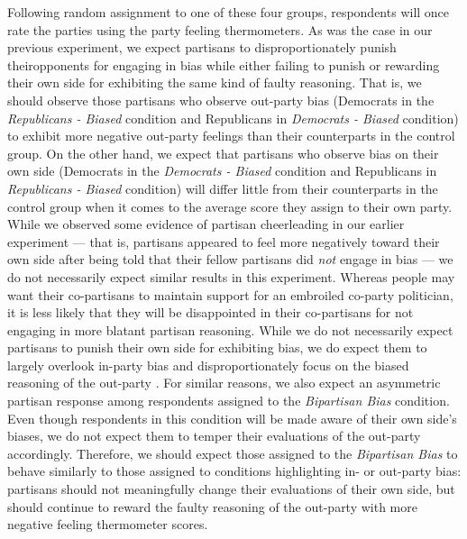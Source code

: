 \documentclass[12pt, letterpaper]{article}
\begin{document}
Following random assignment to one of these four groups, respondents will once rate the parties using the party feeling thermometers. As was the case in our previous experiment, we expect partisans to disproportionately punish theiropponents for engaging in bias while either failing to punish or rewarding their own side for exhibiting the same kind of faulty reasoning. That is, we should observe those partisans who observe out-party bias (Democrats in the \textit{Republicans - Biased} condition and Republicans in \textit{Democrats - Biased} condition) to exhibit more negative out-party feelings than their counterparts in the control group. On the other hand, we expect that partisans who observe bias on their own side (Democrats in the \textit{Democrats - Biased} condition and Republicans in \textit{Republicans - Biased} condition) will differ little from their counterparts in the control group when it comes to the average score they assign to their own party. While we observed some evidence of partisan cheerleading in our earlier experiment --- that is, partisans appeared to feel more negatively toward their own side after being told that their fellow partisans did \textit{not} engage in bias --- we do not necessarily expect similar results in this experiment. Whereas people may want their co-partisans to maintain support for an embroiled co-party politician, it is less likely that they will be disappointed in their co-partisans for not engaging in more blatant partisan reasoning. While we do not necessarily expect partisans to punish their own side for exhibiting bias, we do expect them to largely overlook in-party bias and disproportionately focus on the biased reasoning of the out-party \citep{proninetal_2002,pronin_2007}. For similar reasons, we also expect an asymmetric partisan response among respondents assigned to the \textit{Bipartisan Bias} condition. Even though respondents in this condition will be made aware of their own side's biases, we do not expect them to temper their evaluations of the out-party accordingly. Therefore, we should expect those assigned to the \textit{Bipartisan Bias} to behave similarly to those assigned to conditions highlighting in- or out-party bias: partisans should not meaningfully change their evaluations of their own side, but should continue to reward the faulty reasoning of the out-party with more negative feeling thermometer scores. 
\end{document}
